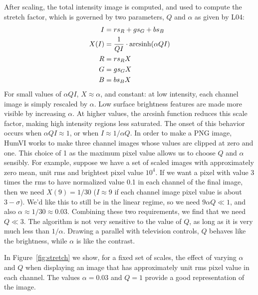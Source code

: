 \documentclass[letterpaper, 11pt]{article}
\def\humvi{{\sc HumVI}\xspace}
\begin{document}
After scaling, the total intensity image is
computed, and used to compute the stretch factor, which is governed by two
parameters, $Q$ and $\alpha$ as given by L04:
\begin{align}
I &= r s_R + g s_G + b s_B \\
X(I) &= \frac{1}{QI}\cdot{\rm arcsinh}(\alpha Q I) \\
R &= r s_R X \\
G &= g s_G X \\
B &= b s_B X \\
\end{align}
For small values of $\alpha Q I$, $X \approx \alpha$, and constant: at low
intensity, each channel image is simply rescaled by $\alpha$. Low surface
brightness features are made more visible by increasing $\alpha$. 
At higher values, 
the arcsinh function reduces this scale factor, making high intensity regions
less saturated. The onset of this behavior occurs when $\alpha Q I \approx 1$,
or when $I \approx 1 / \alpha Q$. 
In order to make a PNG image, \humvi works to make three channel images whose
values are clipped at zero and one. This choice of 1 as the maximum pixel
value allows us to choose $Q$ and $\alpha$ sensibly. For example, suppose we
have a set of scaled images with approximately zero mean, unit 
rms and brightest pixel
value $10^4$. If we want a pixel with value 3 times the rms to have
normalized value 0.1 in each channel of 
the final image, then we need $X(9)=1/30$ ($I\approx9$ if each channel image
pixel value is about $3-\sigma$). We'd
like this to still be in the linear regime, so we need $9 \alpha Q \ll 1$,
and also $\alpha \approx 1/30 \approx 0.03$. Combining these two requirements,
we find that we need $Q
\ll 3$. The algorithm is not very sensitive to the value of $Q$, as long as
it is very much less than $1/\alpha$. 
Drawing a parallel with television controls,
$Q$ behaves like the brightness, while $\alpha$ is like the contrast.

In Figure~\ref{fig:stretch} we show, for a fixed set of scales, the effect of
varying $\alpha$ and $Q$ when displaying an image that has approximately unit
rms pixel value in each channel. The values $\alpha = 0.03$ and $Q = 1$
provide a good representation of the image. 
\end{document}
